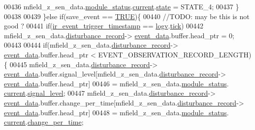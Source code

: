 \begin{DoxyCode}
00436                mfield\_z\_sen\_data.\hyperlink{a00027_adfab5a5d8b45a93dfb13edb24e2b80e3}{module\_status}.\hyperlink{a00019_acf41ffc11da291c2f9f0fcb02ee72b98}{current}.\hyperlink{a00019_a6b8d8e916bc56265a3fd279bd26b6d1b}{state} = STATE\_4;
00437              \}
00438 
00439             \}\textcolor{keywordflow}{else} \textcolor{keywordflow}{if}(save\_event == \hyperlink{a00040_aa8cecfc5c5c054d2875c03e77b7be15d}{TRUE})\{
00440                    \textcolor{comment}{//TODO: may be this is not good ?}
00441                     \textcolor{keywordflow}{if}(\hyperlink{a00017_a6951f534a479b17c02d7da3ad6489634}{ir\_event\_trigger\_timestamp} == 
      \hyperlink{a00021_a2e89c46668b39a17753c238950c9e1ec}{logv}.\hyperlink{a00021_a81f0ce68c2c483fb8df726cc1988d8e8}{tick})
00442                         mfield\_z\_sen\_data.\hyperlink{a00027_ac9b38e2c1d3f1013a88d33506c754152}{disturbance\_record}->
      \hyperlink{a00028_a8c0bda69e71ef674e60da47ad0be9ab0}{event\_data}.buffer.head\_ptr = 0;
00443 
00444                     \textcolor{keywordflow}{if}(mfield\_z\_sen\_data.\hyperlink{a00027_ac9b38e2c1d3f1013a88d33506c754152}{disturbance\_record}->
      \hyperlink{a00028_a8c0bda69e71ef674e60da47ad0be9ab0}{event\_data}.buffer.head\_ptr < EVENT\_OBSERVATION\_RECORD\_LENGTH)\{
00445                     mfield\_z\_sen\_data.\hyperlink{a00027_ac9b38e2c1d3f1013a88d33506c754152}{disturbance\_record}->
      \hyperlink{a00028_a8c0bda69e71ef674e60da47ad0be9ab0}{event\_data}.buffer.signal\_level[mfield\_z\_sen\_data.\hyperlink{a00027_ac9b38e2c1d3f1013a88d33506c754152}{disturbance\_record}->
      \hyperlink{a00028_a8c0bda69e71ef674e60da47ad0be9ab0}{event\_data}.buffer.head\_ptr]
00446                             = mfield\_z\_sen\_data.\hyperlink{a00027_adfab5a5d8b45a93dfb13edb24e2b80e3}{module\_status}.
      \hyperlink{a00019_acf41ffc11da291c2f9f0fcb02ee72b98}{current}.\hyperlink{a00019_a4070db8eab0ff93e3fbc1df59872f117}{signal\_level};
00447                     mfield\_z\_sen\_data.\hyperlink{a00027_ac9b38e2c1d3f1013a88d33506c754152}{disturbance\_record}->
      \hyperlink{a00028_a8c0bda69e71ef674e60da47ad0be9ab0}{event\_data}.buffer.change\_per\_time[mfield\_z\_sen\_data.\hyperlink{a00027_ac9b38e2c1d3f1013a88d33506c754152}{disturbance\_record}->
      \hyperlink{a00028_a8c0bda69e71ef674e60da47ad0be9ab0}{event\_data}.buffer.head\_ptr]
00448                             = mfield\_z\_sen\_data.\hyperlink{a00027_adfab5a5d8b45a93dfb13edb24e2b80e3}{module\_status}.
      \hyperlink{a00019_acf41ffc11da291c2f9f0fcb02ee72b98}{current}.\hyperlink{a00019_a0f645dd76b41adc6a966feba8e4bff8c}{change\_per\_time};

\end{DoxyCode}
